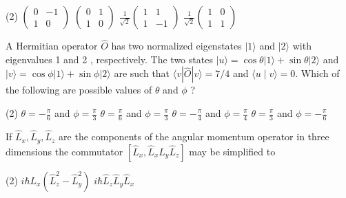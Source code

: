 \begin{enumerate}
\begin{minipage}{\textwidth}
\end{minipage}
\begin{tasks}(2)
	\task[\textbf{A.}] $\left(\begin{array}{cc}0 & -1 \\ 1 & 0\end{array}\right)$
	\task[\textbf{B.}]$\left(\begin{array}{ll}0 & 1 \\ 1 & 0\end{array}\right)$
	\task[\textbf{C.}]$\frac{1}{\sqrt{2}}\left(\begin{array}{cc}1 & 1 \\ 1 & -1\end{array}\right)$
	\task[\textbf{D.}] $\frac{1}{\sqrt{2}}\left(\begin{array}{ll}1 & 0 \\ 1 & 1\end{array}\right)$
\end{tasks}
\begin{minipage}{\textwidth}
	\item A Hermitian operator $\hat{O}$ has two normalized eigenstates $|1\rangle$ and $|2\rangle$ with eigenvalues 1 and 2 , respectively. The two states $|u\rangle=\cos \theta|1\rangle+\sin \theta|2\rangle$ and $|v\rangle=\cos \phi|1\rangle+\sin \phi|2\rangle$ are such that $\langle v|\hat{O}| v\rangle=7 / 4$ and $\langle u \mid v\rangle=0$. Which of the following are possible values of $\theta$ and $\phi$ ?
\end{minipage}
\begin{tasks}(2)
	\task[\textbf{A.}] $\theta=-\frac{\pi}{6}$ and $\phi=\frac{\pi}{3}$
	\task[\textbf{B.}]$\theta=\frac{\pi}{6}$ and $\phi=\frac{\pi}{3}$
	\task[\textbf{C.}]$\theta=-\frac{\pi}{4}$ and $\phi=\frac{\pi}{4}$
	\task[\textbf{D.}]$\theta=\frac{\pi}{3}$ and $\phi=-\frac{\pi}{6}$
\end{tasks}
\begin{minipage}{\textwidth}
	\item If $\hat{L}_{x}, \hat{L}_{y}, \hat{L}_{z}$ are the components of the angular momentum operator in three dimensions the commutator $\left[\hat{L}_{x}, \hat{L}_{x} \hat{L}_{y} \hat{L}_{z}\right]$ may be simplified to
\end{minipage}
\begin{tasks}(2)
	\task[\textbf{A.}] $i \hbar L_{x}\left(\hat{L}_{z}^{2}-\hat{L}_{y}^{2}\right)$
	\task[\textbf{B.}]$i \hbar \hat{L}_{z} \hat{L}_{y} \hat{L}_{x}$

\end{tasks}
\end{enumerate}
